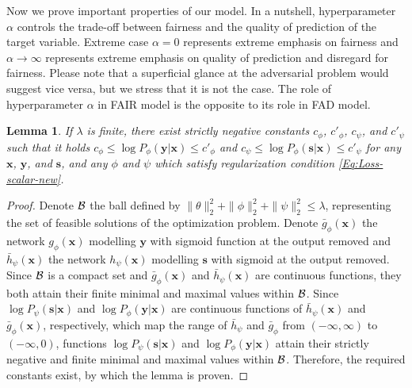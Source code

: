 \documentclass[preprint,12pt]{elsarticle}
\newtheorem{lemma}{Lemma}
\begin{document}
Now we prove important properties of our model. In a nutshell, hyperparameter $\alpha$ controls the trade-off between fairness and the quality of prediction of the target variable. Extreme case $\alpha=0$ represents extreme emphasis on fairness and $\alpha\rightarrow\infty$ represents extreme emphasis on quality of prediction and disregard for fairness. Please note that a superficial glance at the adversarial problem would suggest vice versa, but we stress that it is not the case. The role of hyperparameter $\alpha$ in FAIR model is the opposite to its role in FAD model.

\begin{lemma}
	If $\lambda$ is finite, there exist strictly negative constants
	$c_\phi$, $c'_\phi$, $c_\psi$, and $c'_\psi$ such that it holds
	$c_\phi\leq \log P_\phi(\mathbf{y}|\mathbf{x})\leq c'_\phi$ and
	$c_\psi\leq \log P_\phi(\mathbf{s}|\mathbf{x})\leq c'_\psi$ for
	any $\mathbf{x}$, $\mathbf{y}$, and $\mathbf{s}$, and any
	$\phi$ and $\psi$ which satisfy regularization condition \ref{Eq:Loss-scalar-new}.
	\label{pp:bounded}
\end{lemma}
\begin{proof}
	Denote ${\cal B}$ the ball defined by $\|\theta\|^2_2+\|\phi\|^2_2+\|\psi\|^2_2\leq \lambda$, representing the set of feasible solutions of the optimization problem.
	Denote $\bar{g}_\phi(\mathbf{x})$ the network $g_\phi(\mathbf{x})$ modelling $\mathbf{y}$ with sigmoid function at the output removed and $\bar{h}_\psi(\mathbf{x})$ the network $h_\psi(\mathbf{x})$ modelling $\mathbf{s}$ with sigmoid at the output removed. Since ${\cal B}$ is a compact set and $\bar{g}_\phi(\mathbf{x})$ and $\bar{h}_\psi(\mathbf{x})$ are continuous functions, they both attain their finite minimal and maximal values within ${\cal B}$. Since $\log P_\psi(\mathbf{s}|\mathbf{x})$ and $\log P_\phi(\mathbf{y}|\mathbf{x})$ are continuous functions of  $\bar{h}_\psi(\mathbf{x})$ and $\bar{g}_\phi(\mathbf{x})$, respectively, which map the range of $\bar{h}_\psi$ and $\bar{g}_\phi$ from $(-\infty,\infty)$ to $(-\infty, 0)$, functions $\log P_\psi(\mathbf{s}|\mathbf{x})$ and $\log P_\phi(\mathbf{y}|\mathbf{x})$ attain their strictly negative and finite minimal and maximal values within ${\cal B}$. Therefore, the required constants exist, by which the lemma is proven.
\end{proof}
\end{document}
